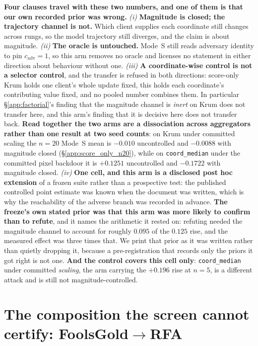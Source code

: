 \documentclass{article}
\begin{document}
\textbf{Four clauses travel with these two numbers, and one of them is that our own recorded prior was wrong.} \emph{(i)} \textbf{Magnitude is closed; the trajectory channel is not.} Which client supplies each coordinate still changes across rungs, so the model trajectory still diverges, and the claim is about magnitude. \emph{(ii)} \textbf{The oracle is untouched.} Mode~S still reads adversary identity to pin $c_{\mathrm{adv}}{=}1$, so this arm removes no oracle and licenses no statement in either direction about behaviour without one. \emph{(iii)} \textbf{A coordinate-wise control is not a selector control}, and the transfer is refused in both directions: score-only Krum holds one client's whole update fixed, this holds each coordinate's contributing value fixed, and no pooled number combines them. In particular §\ref{app:factorial}'s finding that the magnitude channel is \emph{inert} on Krum does not transfer here, and this arm's finding that it is decisive here does not transfer back. \textbf{Read together the two arms are a dissociation across aggregators rather than one result at two seed counts}: on Krum under committed scaling the $n{=}20$ Mode~S mean is $-0.010$ uncontrolled and $-0.0088$ with magnitude closed (§\ref{app:score_only_n20}), while on \texttt{coord\_median} under the committed pixel backdoor it is $+0.1251$ uncontrolled and $-0.1722$ with magnitude closed. \emph{(iv)} \textbf{One cell, and this arm is a disclosed post hoc extension} of a frozen suite rather than a prospective test: the published controlled point estimate was known when the document was written, which is why the reachability of the adverse branch was recorded in advance. \textbf{The freeze's own stated prior was that this arm was more likely to confirm than to refute}, and it names the arithmetic it rested on: refuting needed the magnitude channel to account for roughly $0.095$ of the $0.125$ rise, and the measured effect was three times that. We print that prior as it was written rather than quietly dropping it, because a pre-registration that records only the priors it got right is not one. \textbf{And the control covers this cell only}: \texttt{coord\_median} under committed \emph{scaling}, the arm carrying the $+0.196$ rise at $n{=}5$, is a different attack and is still not magnitude-controlled.


\section{The composition the screen cannot certify: FoolsGold$\to$RFA}
\label{sec:fg_rfa_flagship}
\end{document}
